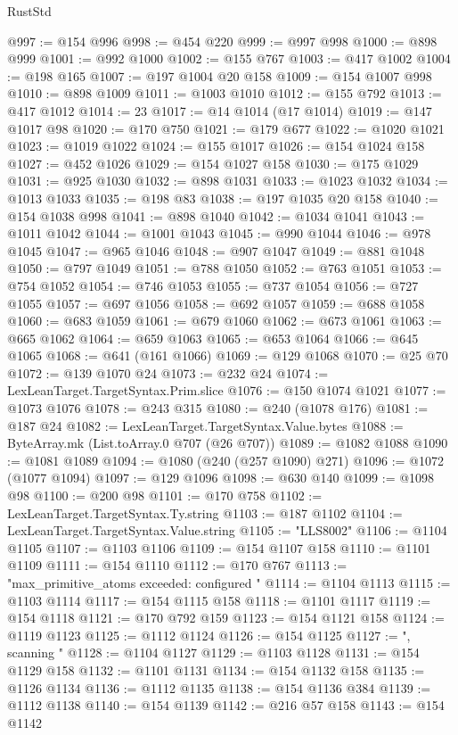 \begin{lexlean}{RustStd}
\begin{coremodule}
{\begin{coremodule}
{{{{{{{{{{{{{{{{{{{{{{{{{{{{{{{{{{{{{{{@997 := @154 @996
@998 := @454 @220
@999 := @997 @998
@1000 := @898 @999
@1001 := @992 @1000
@1002 := @155 @767
@1003 := @417 @1002
@1004 := @198 @165
@1007 := @197 @1004 @20 @158
@1009 := @154 @1007 @998
@1010 := @898 @1009
@1011 := @1003 @1010
@1012 := @155 @792
@1013 := @417 @1012
@1014 := 23
@1017 := @14 @1014 (@17 @1014)
@1019 := @147 @1017 @98
@1020 := @170 @750
@1021 := @179 @677
@1022 := @1020 @1021
@1023 := @1019 @1022
@1024 := @155 @1017
@1026 := @154 @1024 @158
@1027 := @452 @1026
@1029 := @154 @1027 @158
@1030 := @175 @1029
@1031 := @925 @1030
@1032 := @898 @1031
@1033 := @1023 @1032
@1034 := @1013 @1033
@1035 := @198 @83
@1038 := @197 @1035 @20 @158
@1040 := @154 @1038 @998
@1041 := @898 @1040
@1042 := @1034 @1041
@1043 := @1011 @1042
@1044 := @1001 @1043
@1045 := @990 @1044
@1046 := @978 @1045
@1047 := @965 @1046
@1048 := @907 @1047
@1049 := @881 @1048
@1050 := @797 @1049
@1051 := @788 @1050
@1052 := @763 @1051
@1053 := @754 @1052
@1054 := @746 @1053
@1055 := @737 @1054
@1056 := @727 @1055
@1057 := @697 @1056
@1058 := @692 @1057
@1059 := @688 @1058
@1060 := @683 @1059
@1061 := @679 @1060
@1062 := @673 @1061
@1063 := @665 @1062
@1064 := @659 @1063
@1065 := @653 @1064
@1066 := @645 @1065
@1068 := @641 (@161 @1066)
@1069 := @129 @1068
@1070 := @25 @70
@1072 := @139 @1070 @24
@1073 := @232 @24
@1074 := LexLeanTarget.TargetSyntax.Prim.slice
@1076 := @150 @1074 @1021
@1077 := @1073 @1076
@1078 := @243 @315
@1080 := @240 (@1078 @176)
@1081 := @187 @24
@1082 := LexLeanTarget.TargetSyntax.Value.bytes
@1088 := ByteArray.mk (List.toArray.{0} @707 (@26 @707))
@1089 := @1082 @1088
@1090 := @1081 @1089
@1094 := @1080 (@240 (@257 @1090) @271)
@1096 := @1072 (@1077 @1094)
@1097 := @129 @1096
@1098 := @630 @140
@1099 := @1098 @98
@1100 := @200 @98
@1101 := @170 @758
@1102 := LexLeanTarget.TargetSyntax.Ty.string
@1103 := @187 @1102
@1104 := LexLeanTarget.TargetSyntax.Value.string
@1105 := "LLS8002"
@1106 := @1104 @1105
@1107 := @1103 @1106
@1109 := @154 @1107 @158
@1110 := @1101 @1109
@1111 := @154 @1110
@1112 := @170 @767
@1113 := "max_primitive_atoms exceeded: configured "
@1114 := @1104 @1113
@1115 := @1103 @1114
@1117 := @154 @1115 @158
@1118 := @1101 @1117
@1119 := @154 @1118
@1121 := @170 @792 @159
@1123 := @154 @1121 @158
@1124 := @1119 @1123
@1125 := @1112 @1124
@1126 := @154 @1125
@1127 := ", scanning "
@1128 := @1104 @1127
@1129 := @1103 @1128
@1131 := @154 @1129 @158
@1132 := @1101 @1131
@1134 := @154 @1132 @158
@1135 := @1126 @1134
@1136 := @1112 @1135
@1138 := @154 @1136 @384
@1139 := @1112 @1138
@1140 := @154 @1139
@1142 := @216 @57 @158
@1143 := @154 @1142
}}}}}}}}}}}}}}}}}}}}}}}}}}}}}}}}}}}}}}}
\end{coremodule}}
\end{coremodule}
\end{lexlean}
